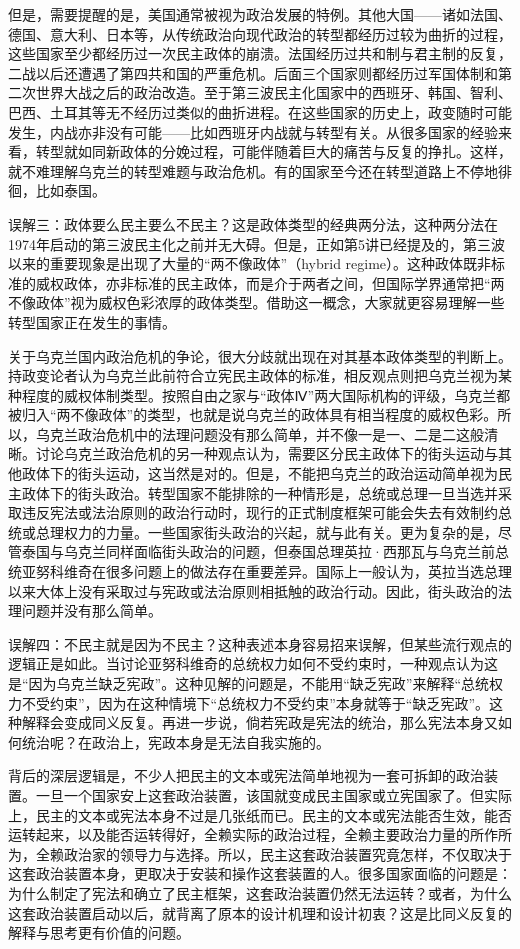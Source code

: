 但是，需要提醒的是，美国通常被视为政治发展的特例。其他大国——诸如法国、德国、意大利、日本等，从传统政治向现代政治的转型都经历过较为曲折的过程，这些国家至少都经历过一次民主政体的崩溃。法国经历过共和制与君主制的反复，二战以后还遭遇了第四共和国的严重危机。后面三个国家则都经历过军国体制和第二次世界大战之后的政治改造。至于第三波民主化国家中的西班牙、韩国、智利、巴西、土耳其等无不经历过类似的曲折进程。在这些国家的历史上，政变随时可能发生，内战亦非没有可能——比如西班牙内战就与转型有关。从很多国家的经验来看，转型就如同新政体的分娩过程，可能伴随着巨大的痛苦与反复的挣扎。这样，就不难理解乌克兰的转型难题与政治危机。有的国家至今还在转型道路上不停地徘徊，比如泰国。

误解三：政体要么民主要么不民主？这是政体类型的经典两分法，这种两分法在1974年启动的第三波民主化之前并无大碍。但是，正如第5讲已经提及的，第三波以来的重要现象是出现了大量的“两不像政体”（hybrid regime）。这种政体既非标准的威权政体，亦非标准的民主政体，而是介于两者之间，但国际学界通常把“两不像政体”视为威权色彩浓厚的政体类型。借助这一概念，大家就更容易理解一些转型国家正在发生的事情。

关于乌克兰国内政治危机的争论，很大分歧就出现在对其基本政体类型的判断上。持政变论者认为乌克兰此前符合立宪民主政体的标准，相反观点则把乌克兰视为某种程度的威权体制类型。按照自由之家与“政体Ⅳ”两大国际机构的评级，乌克兰都被归入“两不像政体”的类型，也就是说乌克兰的政体具有相当程度的威权色彩。所以，乌克兰政治危机中的法理问题没有那么简单，并不像一是一、二是二这般清晰。讨论乌克兰政治危机的另一种观点认为，需要区分民主政体下的街头运动与其他政体下的街头运动，这当然是对的。但是，不能把乌克兰的政治运动简单视为民主政体下的街头政治。转型国家不能排除的一种情形是，总统或总理一旦当选并采取违反宪法或法治原则的政治行动时，现行的正式制度框架可能会失去有效制约总统或总理权力的力量。一些国家街头政治的兴起，就与此有关。更为复杂的是，尽管泰国与乌克兰同样面临街头政治的问题，但泰国总理英拉·西那瓦与乌克兰前总统亚努科维奇在很多问题上的做法存在重要差异。国际上一般认为，英拉当选总理以来大体上没有采取过与宪政或法治原则相抵触的政治行动。因此，街头政治的法理问题并没有那么简单。

误解四：不民主就是因为不民主？这种表述本身容易招来误解，但某些流行观点的逻辑正是如此。当讨论亚努科维奇的总统权力如何不受约束时，一种观点认为这是“因为乌克兰缺乏宪政”。这种见解的问题是，不能用“缺乏宪政”来解释“总统权力不受约束”，因为在这种情境下“总统权力不受约束”本身就等于“缺乏宪政”。这种解释会变成同义反复。再进一步说，倘若宪政是宪法的统治，那么宪法本身又如何统治呢？在政治上，宪政本身是无法自我实施的。

背后的深层逻辑是，不少人把民主的文本或宪法简单地视为一套可拆卸的政治装置。一旦一个国家安上这套政治装置，该国就变成民主国家或立宪国家了。但实际上，民主的文本或宪法本身不过是几张纸而已。民主的文本或宪法能否生效，能否运转起来，以及能否运转得好，全赖实际的政治过程，全赖主要政治力量的所作所为，全赖政治家的领导力与选择。所以，民主这套政治装置究竟怎样，不仅取决于这套政治装置本身，更取决于安装和操作这套装置的人。很多国家面临的问题是：为什么制定了宪法和确立了民主框架，这套政治装置仍然无法运转？或者，为什么这套政治装置启动以后，就背离了原本的设计机理和设计初衷？这是比同义反复的解释与思考更有价值的问题。

